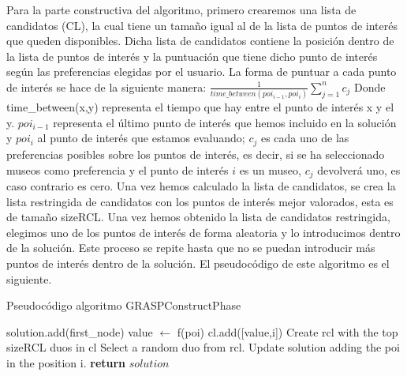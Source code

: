 \vspace{0.06in}
Para la parte constructiva del algoritmo, primero crearemos una lista de candidatos (CL), la cual tiene un tamaño igual al de la lista de puntos de interés que queden disponibles. Dicha lista de candidatos contiene la posición dentro de la lista de puntos de interés y la puntuación que tiene dicho punto de interés según las preferencias elegidas por el usuario. La forma de puntuar a cada punto de interés se hace de la siguiente manera:\newline
$ \frac{1}{time\_between(poi_{i-1},poi_i)}\sum_{j=1}^{n}c_j$ \newline
Donde time\_between(x,y) representa el tiempo que hay entre el punto de interés x y el y. $poi_{i-1}$ representa el último punto de interés que hemos incluido en la solución y $poi_i$ al punto de interés que estamos evaluando; $c_j$ es cada uno de las preferencias posibles sobre los puntos de interés, es decir, si se ha seleccionado museos como preferencia y el punto de interés $i$ es un museo, $c_j$ devolverá uno, es caso contrario es cero.\newline
Una vez hemos calculado la lista de candidatos, se crea la lista restringida de candidatos con los puntos de interés mejor valorados, esta es de tamaño sizeRCL. Una vez hemos obtenido la lista de candidatos restringida, elegimos uno de los puntos de interés de forma aleatoria y lo introducimos dentro de la solución. Este proceso se repite hasta que no se puedan introducir más puntos de interés dentro de la solución. El pseudocódigo de este algoritmo es el siguiente.\newline
\vspace{0.06in}
\begin{algorithm}
	\caption{Pseudocódigo algoritmo GRASPConstructPhase}
	\label{alg:grasp_contruct}
	\begin{algorithmic}
		\State solution.add(first\_node)
				\State value $\gets$ f(poi)
				\State cl.add([value,i])
			\EndFor
			\State Create rcl with the top sizeRCL duos in cl
			\State Select a random duo from rcl.
			\State Update solution adding the poi in the position i.
		\EndWhile
		\State \textbf{return} $solution$
		\EndFunction
	\end{algorithmic}
\end{algorithm}


